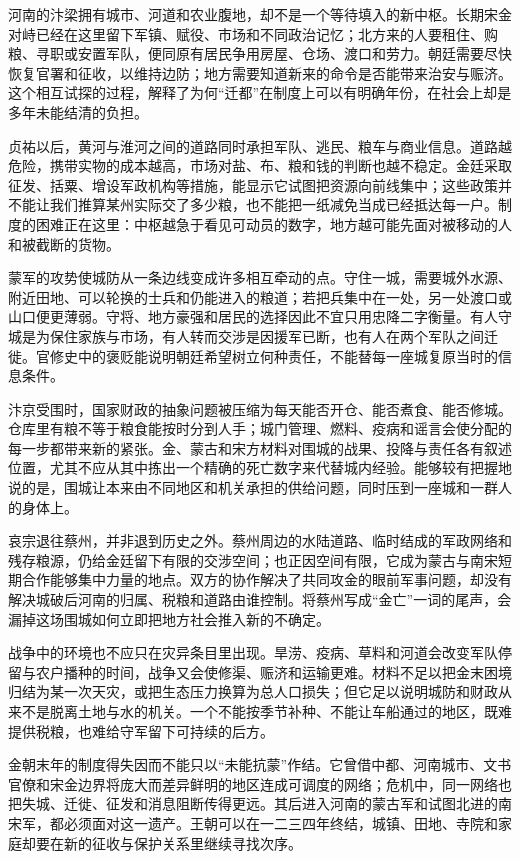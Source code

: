 河南的汴梁拥有城市、河道和农业腹地，却不是一个等待填入的新中枢。长期宋金对峙已经在这里留下军镇、赋役、市场和不同政治记忆；北方来的人要租住、购粮、寻职或安置军队，便同原有居民争用房屋、仓场、渡口和劳力。朝廷需要尽快恢复官署和征收，以维持边防；地方需要知道新来的命令是否能带来治安与赈济。这个相互试探的过程，解释了为何“迁都”在制度上可以有明确年份，在社会上却是多年未能结清的负担。

贞祐以后，黄河与淮河之间的道路同时承担军队、逃民、粮车与商业信息。道路越危险，携带实物的成本越高，市场对盐、布、粮和钱的判断也越不稳定。金廷采取征发、括粟、增设军政机构等措施，能显示它试图把资源向前线集中；这些政策并不能让我们推算某州实际交了多少粮，也不能把一纸减免当成已经抵达每一户。制度的困难正在这里：中枢越急于看见可动员的数字，地方越可能先面对被移动的人和被截断的货物。

蒙军的攻势使城防从一条边线变成许多相互牵动的点。守住一城，需要城外水源、附近田地、可以轮换的士兵和仍能进入的粮道；若把兵集中在一处，另一处渡口或山口便更薄弱。守将、地方豪强和居民的选择因此不宜只用忠降二字衡量。有人守城是为保住家族与市场，有人转而交涉是因援军已断，也有人在两个军队之间迁徙。官修史中的褒贬能说明朝廷希望树立何种责任，不能替每一座城复原当时的信息条件。

汴京受围时，国家财政的抽象问题被压缩为每天能否开仓、能否煮食、能否修城。仓库里有粮不等于粮食能按时分到人手；城门管理、燃料、疫病和谣言会使分配的每一步都带来新的紧张。金、蒙古和宋方材料对围城的战果、投降与责任各有叙述位置，尤其不应从其中拣出一个精确的死亡数字来代替城内经验。能够较有把握地说的是，围城让本来由不同地区和机关承担的供给问题，同时压到一座城和一群人的身体上。

哀宗退往蔡州，并非退到历史之外。蔡州周边的水陆道路、临时结成的军政网络和残存粮源，仍给金廷留下有限的交涉空间；也正因空间有限，它成为蒙古与南宋短期合作能够集中力量的地点。双方的协作解决了共同攻金的眼前军事问题，却没有解决城破后河南的归属、税粮和道路由谁控制。将蔡州写成“金亡”一词的尾声，会漏掉这场围城如何立即把地方社会推入新的不确定。

战争中的环境也不应只在灾异条目里出现。旱涝、疫病、草料和河道会改变军队停留与农户播种的时间，战争又会使修渠、赈济和运输更难。材料不足以把金末困境归结为某一次天灾，或把生态压力换算为总人口损失；但它足以说明城防和财政从来不是脱离土地与水的机关。一个不能按季节补种、不能让车船通过的地区，既难提供税粮，也难给守军留下可持续的后方。

金朝末年的制度得失因而不能只以“未能抗蒙”作结。它曾借中都、河南城市、文书官僚和宋金边界将庞大而差异鲜明的地区连成可调度的网络；危机中，同一网络也把失城、迁徙、征发和消息阻断传得更远。其后进入河南的蒙古军和试图北进的南宋军，都必须面对这一遗产。王朝可以在一二三四年终结，城镇、田地、寺院和家庭却要在新的征收与保护关系里继续寻找次序。

